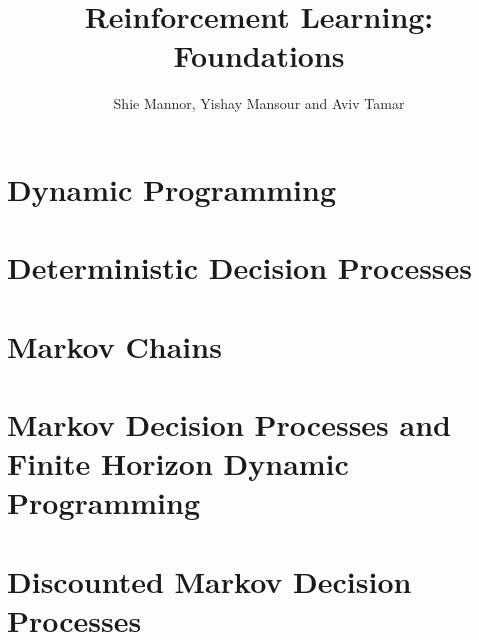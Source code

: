 \documentclass[12pt]{book}
\title{Reinforcement Learning: Foundations}
\date{February 2023
\\
  \textcolor{red}{This book is still work in progress. In particular, references to literature are not complete. We would be grateful for comments, suggestions, omissions, and errors of any kind, at \url{rlfoundationsbook@gmail.com}. }

}
\author{Shie Mannor, Yishay Mansour and Aviv Tamar}
\begin{document}
\maketitle

\tableofcontents

\chapter{Dynamic Programming}
\label{chapter:dp}


\chapter{Deterministic Decision Processes}
\label{chapter:DDP}


\chapter{Markov Chains}
\label{chapter:MC}


\chapter{Markov Decision Processes and Finite Horizon Dynamic Programming}
\label{chapter:MDP-FH}


\chapter{Discounted Markov Decision Processes}
\label{chapter:disc}




\end{document}
